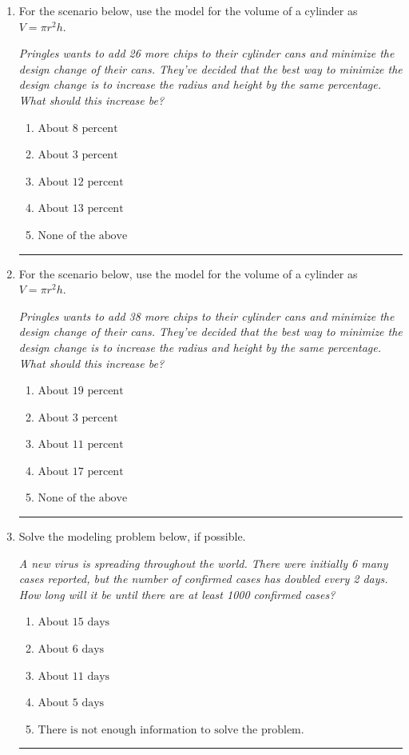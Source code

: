 \documentclass[14pt]{extbook}
\newcommand{\litem}[1]{\item#1\hspace*{-1cm}\rule{\textwidth}{0.4pt}}
\begin{document}
\begin{enumerate}
{\begin{enumerate}[label=\Alph*.]
\end{enumerate} }
\litem{
For the scenario below, use the model for the volume of a cylinder as $V = \pi r^2 h$.
\begin{center}
    \textit{ Pringles wants to add 26 \text{percent} more chips to their cylinder cans and minimize the design change of their cans. They've decided that the best way to minimize the design change is to increase the radius and height by the same percentage. What should this increase be? }
\end{center}
\begin{enumerate}[label=\Alph*.]
\item \( \text{About } 8 \text{ percent} \)
\item \( \text{About } 3 \text{ percent} \)
\item \( \text{About } 12 \text{ percent} \)
\item \( \text{About } 13  \)
\item \( \text{None of the above} \)

\end{enumerate} }
\litem{
For the scenario below, use the model for the volume of a cylinder as $V = \pi r^2 h$.
\begin{center}
    \textit{ Pringles wants to add 38 \text{percent} more chips to their cylinder cans and minimize the design change of their cans. They've decided that the best way to minimize the design change is to increase the radius and height by the same percentage. What should this increase be? }
\end{center}
\begin{enumerate}[label=\Alph*.]
\item \( \text{About } 19 \text{ percent} \)
\item \( \text{About } 3 \text{ percent} \)
\item \( \text{About } 11 \text{ percent} \)
\item \( \text{About } 17 \text{ percent} \)
\item \( \text{None of the above} \)

\end{enumerate} }
\litem{
Solve the modeling problem below, if possible.
\begin{center}
    \textit{ A new virus is spreading throughout the world. There were initially 6 many cases reported, but the number of confirmed cases has doubled every 2 days. How long will it be until there are at least 1000 confirmed cases? }
\end{center}
\begin{enumerate}[label=\Alph*.]
\item \( \text{About } 15 \text{ days} \)
\item \( \text{About } 6 \text{ days} \)
\item \( \text{About } 11 \text{ days} \)
\item \( \text{About } 5 \text{ days} \)
\item \( \text{There is not enough information to solve the problem.} \)


\end{enumerate}}
\end{enumerate}
\end{document}
